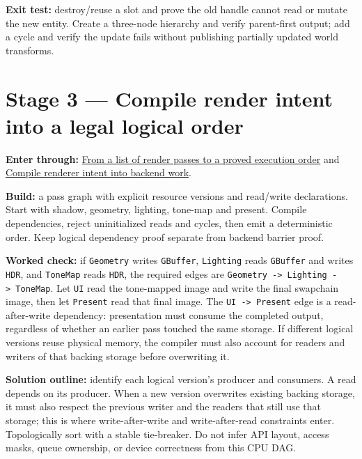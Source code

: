 \textbf{Exit test:} destroy/reuse a slot and prove the old handle cannot read or mutate the new entity. Create a three-node hierarchy and verify parent-first output; add a cycle and verify the update fails without publishing partially updated world transforms.

\section{Stage 3 --- Compile render intent into a legal logical order}\label{06-engine-ii-ch042-stage-3-compile-render-intent-into-a-legal-logical-order}

\textbf{Enter through:} \hyperref[06-engine-ii-ch042-from-a-list-of-render-passes-to-a-proved-execution-order]{From a list of render passes to a proved execution order} and \hyperref[06-engine-ii-ch043-compile-renderer-intent-into-backend-work]{Compile renderer intent into backend work}.

\textbf{Build:} a pass graph with explicit resource versions and read/write declarations. Start with shadow, geometry, lighting, tone-map and present. Compile dependencies, reject uninitialized reads and cycles, then emit a deterministic order. Keep logical dependency proof separate from backend barrier proof.

\textbf{Worked check:} if \texttt{Geometry} writes \texttt{GBuffer}, \texttt{Lighting} reads \texttt{GBuffer} and writes \texttt{HDR}, and \texttt{ToneMap} reads \texttt{HDR}, the required edges are \texttt{Geometry\ -\textgreater{}\ Lighting\ -\textgreater{}\ ToneMap}. Let \texttt{UI} read the tone-mapped image and write the final swapchain image, then let \texttt{Present} read that final image. The \texttt{UI\ -\textgreater{}\ Present} edge is a read-after-write dependency: presentation must consume the completed output, regardless of whether an earlier pass touched the same storage. If different logical versions reuse physical memory, the compiler must also account for readers and writers of that backing storage before overwriting it.

\textbf{Solution outline:} identify each logical version's producer and consumers. A read depends on its producer. When a new version overwrites existing backing storage, it must also respect the previous writer and the readers that still use that storage; this is where write-after-write and write-after-read constraints enter. Topologically sort with a stable tie-breaker. Do not infer API layout, access masks, queue ownership, or device correctness from this CPU DAG.

